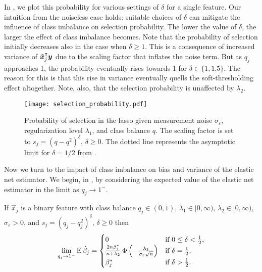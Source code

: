 In , we plot this probability for various settings of
\(\delta\) for a single feature. Our intuition from the noiseless case holds: suitable
choices of \(\delta\) can mitigate the influence of class imbalance on selection
probability. The lower the value of \(\delta\), the larger the effect of class imbalance
becomes. Note that the probability of selection initially decreases also in the case when
\(\delta \geq 1\). This is a consequence of increased variance of \(\tilde{\bm{x}}_j^\intercal
\bm{y}\) due to the scaling factor that inflates the noise term. But as \(q_j\) approaches
1, the probability eventually rises towards 1 for \(\delta \in \{1, 1.5\}\). The reason for
this is that this rise in variance eventually quells the soft-thresholding effect
altogether. Note, also, that the selection probability is unaffected by \(\lambda_2\).

\begin{figure}[htpb]
  \centering
  \texttt{[image: selection\_probability.pdf]}
  \caption{%
    Probability of selection in the lasso given measurement noise
    \(\sigma_\varepsilon\), regularization level \(\lambda_1\), and class
    balance \(q\). The scaling factor is set to \(s_j = (q - q^2)^\delta\),
    \(\delta \geq 0\). The dotted line represents the asymptotic limit for
    \(\delta = 1/2\) from .
    \label{fig:selection-probability}}
\end{figure}

Now we turn to the impact of class imbalance on bias and variance of the elastic net
estimator. We begin, in , by considering the expected value of
the elastic net estimator in the limit as \(q_j \rightarrow 1^-\).

\begin{theorem}
  \label{thm:classbalance-bias}
  If \(\vec{x}_j\) is a binary feature with class balance \(q_j \in (0, 1)\),
  \(\lambda_1 \in [0,\infty)\), \(\lambda_2 \in [0,\infty)\),
  \(\sigma_\varepsilon > 0\), and \(s_j = (q_j - q_j^2)^{\delta}\), \(\delta
  \geq 0\)  then
  \[
    \lim_{q_j \rightarrow 1^-} \operatorname{E} \hat{\beta}_j =
    \begin{cases}
      0                                                                                                  & \text{if } 0 \leq \delta < \frac{1}{2}, \\
      \frac{2n \beta_j^*}{n + \lambda_2} \operatorname{\Phi}\left(-\frac{\lambda_1}{\sigma_\varepsilon \sqrt{n}}\right) & \text{if } \delta = \frac{1}{2},        \\
      \beta^*_j                                                                                          & \text{if } \delta > \frac{1}{2}.
    \end{cases}
  \]
\end{theorem}

